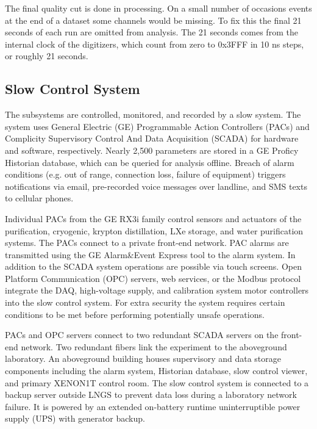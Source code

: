 The final quality cut is done in processing.  On a small number of occasions events at the end of a dataset some channels
would be missing.  To fix this the final 21 seconds of each run are omitted from analysis.  The 21 seconds comes from the
internal clock of the digitizers, which count from zero to 0x3FFF in 10 ns steps, or roughly 21 seconds.



\subsection{Slow Control System}
\label{subsec:xenon1t_detector_slow_control}
The subsystems are controlled, monitored, and recorded by a slow system.  The system uses General Electric (GE) Programmable
Action Controllers (PACs) and Complicity Supervisory Control And Data Acquisition (SCADA) for hardware and software, respectively.  Nearly
2,500 parameters are stored in a GE Proficy Historian database, which can be queried for analysis offline.  Breach of alarm conditions
(e.g. out of range, connection loss, failure of equipment) triggers notifications via email, pre-recorded voice messages over landline,
and SMS texts to cellular phones.

Individual PACs from the GE RX3i family control sensors and actuators of the purification, cryogenic, krypton distillation,
LXe storage, and water purification systems.  The PACs connect to a private front-end network.  PAC alarms are transmitted using the
GE Alarm\&Event Express tool to the alarm system.  In addition to the SCADA system operations are possible via touch screens.  Open
Platform Communication (OPC) servers, web services, or the Modbus protocol integrate the DAQ, high-voltage supply, and calibration
system motor controllers into the slow control system.  For extra security the system requires certain conditions to be met before
performing potentially unsafe operations.

PACs and OPC servers connect to two redundant SCADA servers on the front-end network.  Two redundant fibers link the experiment to the
aboveground laboratory.  An aboveground building houses supervisory and data storage components including the alarm system, Historian
database, slow control viewer, and primary XENON1T control room.  The slow control system is connected to a backup server outside LNGS
to prevent data loss during a laboratory network failure.  It is powered by an extended on-battery runtime
uninterruptible power supply (UPS) with generator backup.



